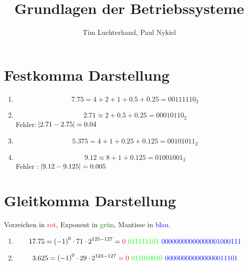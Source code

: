 \documentclass[DIN, pagenumber=false, fontsize=11pt, parskip=half]{scrartcl}
\title{Grundlagen der Betriebssysteme}
\author{Tim Luchterhand, Paul Nykiel}
\begin{document}
    \maketitle
    \section{Festkomma Darstellung}
    \begin{enumerate}[label=(\alph*)]
        \item 
            \begin{equation*}
                7.75 = 4 + 2 + 1 + 0.5 + 0.25 = {00111110}_2
            \end{equation*}
        \item
            \begin{equation*}
                2.71 \approx 2 + 0.5 + 0.25 = {00010110}_2
            \end{equation*}
            Fehler: $\abs{2.71 - 2.75} = 0.04$
        \item
            \begin{equation*}
                5.375 = 4 + 1 + 0.25 + 0.125 = {00101011}_2
            \end{equation*}
        \item
            \begin{equation*}
                9.12 \approx 8 + 1 + 0.125 = {01001001}_2
            \end{equation*}
            Fehler : $\abs{9.12 - 9.125} = 0.005$
    \end{enumerate}
    \section{Gleitkomma Darstellung}
    Vorzeichen in \textcolor{red}{rot}, Exponent in \textcolor{green}{grün}, Mantisse in \textcolor{blue}{blau}.
    \begin{enumerate}[label = (\alph*)]
        \item
            \begin{equation*}
                17.75 = {(-1)}^0 \cdot 71 \cdot 2^{125-127} = \textcolor{red}{0}\ \textcolor{green}{011111101}\ \textcolor{blue}{00000000000000001000111}
            \end{equation*}
        \item 
            \begin{equation*}
                3.625 = {(-1)}^0 \cdot 29 \cdot 2^{124 - 127} = \textcolor{red}{0}\ \textcolor{green}{011010010}\ \textcolor{blue}{000000000000000011101}
            \end{equation*}
    \end{enumerate}
\end{document}
